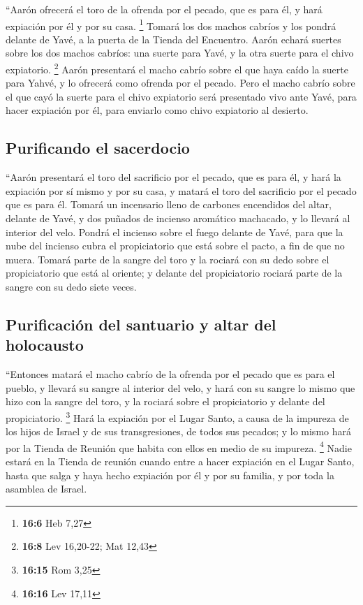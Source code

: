  ``Aarón ofrecerá el toro de la ofrenda por el pecado, que
es para él, y hará expiación por él y por su casa. \footnote{\textbf{16:6}
  Heb 7,27}  Tomará los dos machos cabríos y los pondrá
delante de Yavé, a la puerta de la Tienda del Encuentro. 
Aarón echará suertes sobre los dos machos cabríos: una suerte para Yavé,
y la otra suerte para el chivo expiatorio. \footnote{\textbf{16:8} Lev
  16,20-22; Mat 12,43}  Aarón presentará el macho cabrío
sobre el que haya caído la suerte para Yahvé, y lo ofrecerá como ofrenda
por el pecado.  Pero el macho cabrío sobre el que cayó la
suerte para el chivo expiatorio será presentado vivo ante Yavé, para
hacer expiación por él, para enviarlo como chivo expiatorio al desierto.

\hypertarget{purificando-el-sacerdocio}{%
\subsection{Purificando el sacerdocio}\label{purificando-el-sacerdocio}}

 ``Aarón presentará el toro del sacrificio por el pecado,
que es para él, y hará la expiación por sí mismo y por su casa, y matará
el toro del sacrificio por el pecado que es para él. 
Tomará un incensario lleno de carbones encendidos del altar, delante de
Yavé, y dos puñados de incienso aromático machacado, y lo llevará al
interior del velo.  Pondrá el incienso sobre el fuego
delante de Yavé, para que la nube del incienso cubra el propiciatorio
que está sobre el pacto, a fin de que no muera.  Tomará
parte de la sangre del toro y la rociará con su dedo sobre el
propiciatorio que está al oriente; y delante del propiciatorio rociará
parte de la sangre con su dedo siete veces.

\hypertarget{purificaciuxf3n-del-santuario-y-altar-del-holocausto}{%
\subsection{Purificación del santuario y altar del
holocausto}\label{purificaciuxf3n-del-santuario-y-altar-del-holocausto}}

 ``Entonces matará el macho cabrío de la ofrenda por el
pecado que es para el pueblo, y llevará su sangre al interior del velo,
y hará con su sangre lo mismo que hizo con la sangre del toro, y la
rociará sobre el propiciatorio y delante del propiciatorio. \footnote{\textbf{16:15}
  Rom 3,25}  Hará la expiación por el Lugar Santo, a
causa de la impureza de los hijos de Israel y de sus transgresiones, de
todos sus pecados; y lo mismo hará por la Tienda de Reunión que habita
con ellos en medio de su impureza. \footnote{\textbf{16:16} Lev 17,11}
 Nadie estará en la Tienda de reunión cuando entre a
hacer expiación en el Lugar Santo, hasta que salga y haya hecho
expiación por él y por su familia, y por toda la asamblea de Israel.

